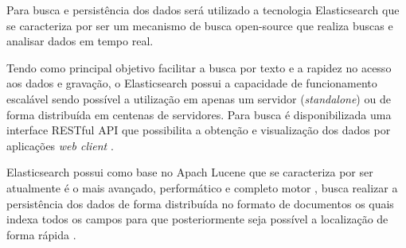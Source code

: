 Para busca e persistência dos dados será utilizado a tecnologia Elasticsearch que se caracteriza por ser um mecanismo de busca open-source que realiza buscas e analisar dados em tempo real.

Tendo como principal objetivo facilitar a busca por texto e a rapidez no acesso aos dados e gravação, o Elasticsearch possui a capacidade de funcionamento escalável sendo possível a utilização em apenas um servidor (\textit{standalone}) ou de forma distribuída em centenas de servidores.  Para busca é disponibilizada uma interface RESTful API que possibilita a obtenção e visualização dos dados por aplicações \textit{web client} \cite{Gormley:2015}.

Elasticsearch possui como base no Apach Lucene que se caracteriza por ser atualmente é o mais avançado, performático e completo motor , busca realizar a persistência dos dados de forma distribuída no formato de documentos os quais indexa todos os campos para que posteriormente seja possível a localização de forma rápida \cite{Gormley:2015}. 

